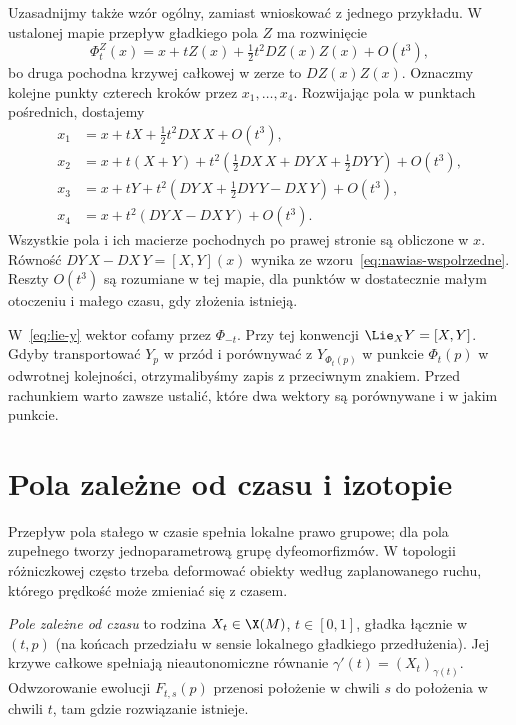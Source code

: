 Uzasadnijmy także wzór ogólny, zamiast wnioskować z jednego przykładu.
W ustalonej mapie przepływ gładkiego pola $Z$ ma rozwinięcie
\[
 \Phi_t^Z(x)=x+tZ(x)+\tfrac12t^2 DZ(x)Z(x)+O(t^3),
\]
bo druga pochodna krzywej całkowej w zerze to $DZ(x)Z(x)$.
Oznaczmy kolejne punkty czterech kroków przez $x_1,\ldots,x_4$.
Rozwijając pola w punktach pośrednich, dostajemy
\begin{align*}
 x_1&=x+tX+\tfrac12t^2 DX\,X+O(t^3),\\
 x_2&=x+t(X+Y)+t^2(\tfrac12 DX\,X+DY\,X+\tfrac12 DY\,Y)+O(t^3),\\
 x_3&=x+tY+t^2(DY\,X+\tfrac12 DY\,Y-DX\,Y)+O(t^3),\\
 x_4&=x+t^2(DY\,X-DX\,Y)+O(t^3).
\end{align*}
Wszystkie pola i ich macierze pochodnych po prawej stronie
są obliczone w $x$. Równość $DY\,X-DX\,Y=[X,Y](x)$
wynika ze wzoru~\eqref{eq:nawias-wspolrzedne}.
Reszty $O(t^3)$ są rozumiane w tej mapie, dla punktów w
dostatecznie małym otoczeniu i małego czasu, gdy złożenia istnieją.


\begin{uwaga}
W~\eqref{eq:lie-y} wektor cofamy przez $\Phi_{-t}$.
Przy tej konwencji $\Lie_XY=[X,Y]$. Gdyby transportować
$Y_p$ w przód i porównywać z $Y_{\Phi_t(p)}$ w punkcie
$\Phi_t(p)$ w odwrotnej kolejności, otrzymalibyśmy zapis
z przeciwnym znakiem. Przed rachunkiem warto zawsze ustalić,
które dwa wektory są porównywane i w jakim punkcie.
\end{uwaga}

\section{Pola zależne od czasu i izotopie}
\label{sec:izotopie}

Przepływ pola stałego w czasie spełnia lokalne prawo grupowe;
dla pola zupełnego tworzy jednoparametrową grupę dyfeomorfizmów.
W topologii różniczkowej często trzeba deformować obiekty według
zaplanowanego ruchu, którego prędkość może zmieniać się z czasem.

\begin{definicja}
\emph{Pole zależne od czasu} to rodzina $X_t\in\X(M)$,
$t\in[0,1]$, gładka łącznie w $(t,p)$ (na końcach przedziału
w sensie lokalnego gładkiego przedłużenia). Jej krzywe całkowe spełniają nieautonomiczne równanie
$\gamma'(t)=(X_t)_{\gamma(t)}$. Odwzorowanie ewolucji
$F_{t,s}(p)$ przenosi położenie w chwili $s$ do położenia
w chwili $t$, tam gdzie rozwiązanie istnieje.
\end{definicja}


